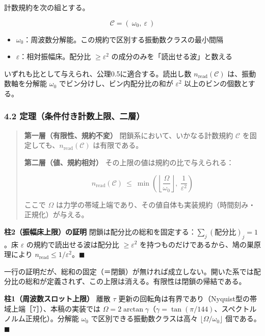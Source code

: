 \documentclass[
  a4paper,
]{ltjsarticle}
\providecommand{\tightlist}{%
  \setlength{\itemsep}{0pt}\setlength{\parskip}{0pt}}
\begin{document}
計数規約を次の組とする。

\[
\mathcal C=(\ \omega_0,\ \varepsilon\ )
\]

\begin{itemize}
\tightlist
\item
  \(\omega_0\)：周波数分解能。この規約で区別する振動数クラスの最小間隔
\item
  \(\varepsilon\)：相対振幅床。配分比 \(\ge\varepsilon^2\)
  の成分のみを「読出せる波」と数える
\end{itemize}

いずれも比として与えられ、公理0.5に適合する。読出し数
\(n_{\mathrm{read}}(\mathcal C)\) は、振動数軸を分解能 \(\omega_0\)
でビン分けし、ビン内配分比の和が \(\varepsilon^2\)
以上のビンの個数とする。

\subsubsection{4.2
定理（条件付き計数上限、二層）}\label{ux5b9aux7406ux6761ux4ef6ux4ed8ux304dux8a08ux6570ux4e0aux9650ux4e8cux5c64}

\begin{quote}
\textbf{第一層（有限性、規約不変）} 閉鎖系において、いかなる計数規約
\(\mathcal C\) を固定しても、\(n_{\mathrm{read}}(\mathcal C)\)
は有限である。

\textbf{第二層（値、規約相対）} その上限の値は規約の比で与えられる：

\[
n_{\mathrm{read}}(\mathcal C)\ \le\ \min\left(\left\lfloor\frac{\Omega}{\omega_0}\right\rfloor,\ \frac{1}{\varepsilon^2}\right)
\]

ここで \(\Omega\)
は力学の帯域上端であり、その値自体も実装規約（時間刻み・正規化）が与える。
\end{quote}

\textbf{柱2（振幅床上限）の証明}
閉鎖は配分比の総和を固定する：\(\sum_j(\text{配分比})_j=1\)。床
\(\varepsilon\) の規約で読出せる波は配分比 \(\ge\varepsilon^2\)
を持つものだけであるから、鳩の巣原理により
\(n_{\mathrm{read}}\le1/\varepsilon^2\)。\(\blacksquare\)

一行の証明だが、総和の固定（＝閉鎖）が無ければ成立しない。開いた系では配分比の総和が定義されず、この上限は消える。有限性は閉鎖の帰結である。

\textbf{柱1（周波数スロット上限）} 離散 \(\tau\)
更新の回転角は有界であり（Nyquist型の帯域上端［7］）、本稿の実装では
\(\Omega=2\arctan\gamma\)（\(\gamma=\tan(\pi/144)\)、スペクトルノルム正規化）。分解能
\(\omega_0\) で区別できる振動数クラスは高々
\(\lfloor\Omega/\omega_0\rfloor\) 個である。\(\blacksquare\)
\end{document}
